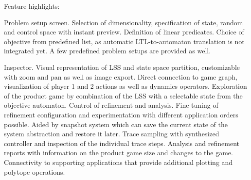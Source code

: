 

Feature highlights:

Problem setup screen.
Selection of dimensionality, specification of state, random and control space with instant preview.
Definition of linear predicates.
Choice of objective from predefined list, as automatic LTL-to-automaton translation is not integrated yet.
A few predefined problem setups are provided as well.

Inspector.
Visual representation of LSS and state space partition, customizable with zoom and pan as well as image export.
Direct connection to game graph, visualization of player 1 and 2 actions as well as dynamics operators.
Exploration of the product game by combination of the LSS with a selectable state from the objective automaton.
Control of refinement and analysis.
Fine-tuning of refinement configuration and experimentation with different application orders possible.
Aided by snapshot system which can save the current state of the system abstraction and restore it later.
Trace sampling with synthesized controller and inspection of the individual trace steps.
Analysis and refinement reports with information on the product game size and changes to the game.
Connectivity to supporting applications that provide additional plotting and polytope operations.

